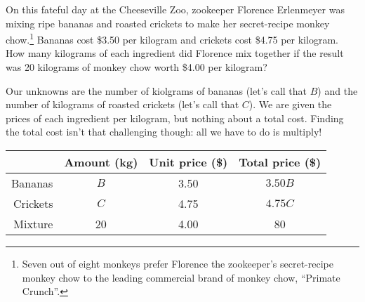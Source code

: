 
\begin{boxex}
On this fateful day at the Cheeseville Zoo, zookeeper Florence Erlenmeyer was mixing ripe bananas and roasted crickets to make her secret-recipe monkey chow.\footnote{Seven out of eight monkeys prefer Florence the zookeeper's secret-recipe monkey chow to the leading commercial brand of monkey chow, ``Primate Crunch''.} Bananas cost \$3.50 per kilogram and crickets cost \$4.75 per kilogram. How many kilograms of each ingredient did Florence mix together if the result was 20 kilograms of monkey chow worth \$4.00 per kilogram?
\end{boxex}


Our unknowns are the number of kiolgrams of bananas (let's call that $B$) and the number of kilograms of roasted crickets (let's call that $C$). We are given the prices of each ingredient per kilogram, but nothing about a total cost. Finding the total cost isn't that challenging though: all we have to do is multiply!

\begin{center}
\begin{tabular}{r|ccc}
				& Amount (kg)			& Unit price (\$)			& Total price (\$)\\\hline
Bananas			& $B$					& 3.50				& $3.50B$\\
Crickets			& $C$					& 4.75				& $4.75C$\\
Mixture			& 20					& 4.00				& 80\\
\end{tabular}
\end{center}


